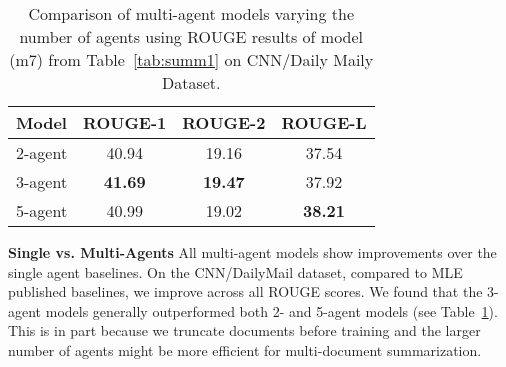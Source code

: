\documentclass[11pt,a4paper]{article}
\begin{document}
\begin{table}[h]
	\small
    \centering
\begin{tabular}{lccc}
\hline
Model & ROUGE-1 & ROUGE-2 & ROUGE-L \\ \hline
\hline
2-agent & 40.94 & 19.16 & 37.54 \\
3-agent & \textbf{41.69} & \textbf{19.47} & 37.92 \\
5-agent &  40.99 & 19.02 & \textbf{38.21} \\
\hline
\end{tabular}
\vskip -0.1in
\caption{Comparison of multi-agent models varying the number of agents using ROUGE results of model (m7) from Table~\ref{tab:summ1} on CNN/Daily Maily Dataset.}
\label{multiagentcomparison}
\end{table}
\noindent \textbf{Single vs. Multi-Agents} All multi-agent models show improvements over the single agent baselines.
On the CNN/DailyMail dataset, compared to MLE published baselines, we improve across all ROUGE scores. We found that the 3-agent models generally outperformed both 2- and 5-agent models (see Table~\ref{multiagentcomparison}). 
This is in part because 
we truncate documents before training and 
the larger number of agents might be more efficient for multi-document summarization.
\end{document}
